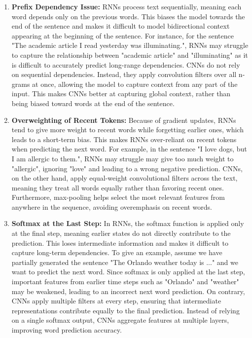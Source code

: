\documentclass[10pt]{article}
\begin{document}
\begin{description}
\begin{enumerate}
    \item \textbf{Prefix Dependency Issue:} RNNs process text sequentially, meaning each word depends only on the previous words.
    This biases the model towards the end of the sentence and makes it difficult to model bidirectional context appearing at the beginning of the sentence.
    For instance, for the sentence "The academic article I read yesterday was illuminating.", RNNs may struggle to capture the relationship between "academic article" and "illuminating"
    as it is difficult to accurately predict long-range dependencies. 
    CNNs do not rely on sequential dependencies. 
    Instead, they apply convolution filters over all n-grams at once, allowing the model to capture context from any part of the input.
    This makes CNNs better at capturing global context, rather than being biased toward words at the end of the sentence.
    \item \textbf{Overweighting of Recent Tokens:} Because of gradient updates, RNNs tend to give more weight to recent words while forgetting earlier ones, 
    which leads to a short-term bias. This makes RNNs over-reliant on recent tokens when predicting the next word.
    For example, in the sentence "I love dogs, but I am allergic to them.", RNNs may struggle may give too much weight to "allergic", ignoring "love" and leading to a wrong negative
    prediction.
    CNNs, on the other hand, apply equal-weight convolutional filters across the text, meaning they treat all words equally rather than favoring recent ones.
    Furthermore, max-pooling helps select the most relevant features from anywhere in the sequence, avoiding overemphasis on recent words.
    \item \textbf{Softmax at the Last Step:} In RNNs, the softmax function is applied only at the final step, meaning earlier states do not directly 
    contribute to the prediction. This loses intermediate information and makes it difficult to capture long-term dependencies.
    To give an example, assume we have partially generated the sentence "The Orlando weather today is ..." and we want to predict the next word.
    Since softmax is only applied at the last step, important features from earlier time steps such as "Orlando" and "weather" may be weakened, 
    leading to an incorrect next word prediction.
    On contrary, CNNs apply multiple filters at every step, ensuring that intermediate representations contribute equally to the final prediction.
    Instead of relying on a single softmax output, CNNs aggregate features at multiple layers, improving word prediction accuracy.
\end{enumerate}

\end{description}
\end{document}
